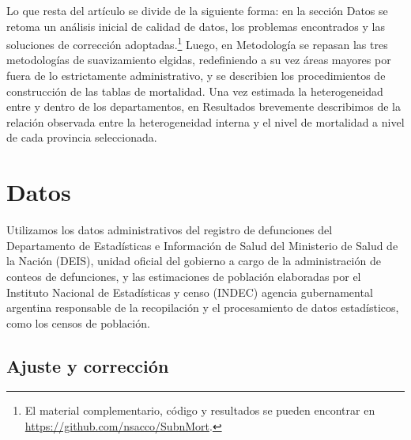 \documentclass[12pt,]{article}
\begin{document}
Lo que resta del artículo se divide de la siguiente forma: en la sección
Datos se retoma un análisis inicial de calidad de datos, los problemas
encontrados y las soluciones de corrección adoptadas.\footnote{El
  material complementario, código y resultados se pueden encontrar en
  \url{https://github.com/nsacco/SubnMort}.} Luego, en Metodología se
repasan las tres metodologías de suavizamiento elgidas, redefiniendo a
su vez áreas mayores por fuera de lo estrictamente administrativo, y se
describien los procedimientos de construcción de las tablas de
mortalidad. Una vez estimada la heterogeneidad entre y dentro de los
departamentos, en Resultados brevemente describimos de la relación
observada entre la heterogeneidad interna y el nivel de mortalidad a
nivel de cada provincia seleccionada.

\hypertarget{datos}{%
\section{Datos}\label{datos}}

Utilizamos los datos administrativos del registro de defunciones del
Departamento de Estadísticas e Información de Salud del Ministerio de
Salud de la Nación (DEIS), unidad oficial del gobierno a cargo de la
administración de conteos de defunciones, y las estimaciones de
población elaboradas por el Instituto Nacional de Estadísticas y censo
(INDEC) agencia gubernamental argentina responsable de la recopilación y
el procesamiento de datos estadísticos, como los censos de población.

\hypertarget{ajuste-y-correcciuxf3n}{%
\subsection{Ajuste y corrección}\label{ajuste-y-correcciuxf3n}}
\end{document}
